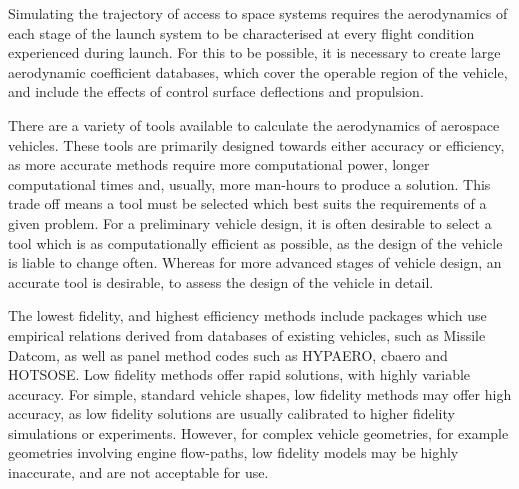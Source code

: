 Simulating the trajectory of access to space systems requires the aerodynamics of each stage of the launch system to be characterised at every flight condition experienced during launch. For this to be possible, it is necessary to create large aerodynamic coefficient databases, which cover the operable region of the vehicle, and include the effects of control surface deflections and propulsion.

There are a variety of tools available to calculate the aerodynamics of aerospace vehicles.
 These tools are primarily designed towards either accuracy or efficiency, as more accurate methods require more computational power, longer computational times and, usually, more man-hours to produce a solution. 
This trade off means a tool must be selected which best suits the requirements of a given problem. 
For a preliminary vehicle design, it is often desirable to select a tool which is as computationally efficient as possible, as the design of the vehicle is liable to change often. 
Whereas for more advanced stages of vehicle design, an accurate tool is desirable, to assess the design of the vehicle in detail. 

The lowest fidelity, and highest efficiency methods include packages which use empirical relations derived from databases of existing vehicles, such as Missile Datcom\cite{Rosema2011}, as well as panel method codes such as HYPAERO\cite{Preller2017b}, cbaero\cite{Kinney2004} and HOTSOSE\cite{hotsose}. Low fidelity methods offer rapid solutions, with highly variable accuracy. For simple, standard vehicle shapes, low fidelity methods may offer high accuracy, as low fidelity solutions are usually calibrated to higher fidelity simulations or experiments. However, for complex vehicle geometries, for example geometries involving engine flow-paths, low fidelity models may be highly inaccurate, and are not acceptable for use\cite{Krause2011}. 

